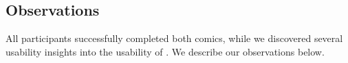 




\subsection{Observations}
All participants successfully completed both comics, while we discovered several usability insights into the usability of \toolname{}. We describe our observations below.

